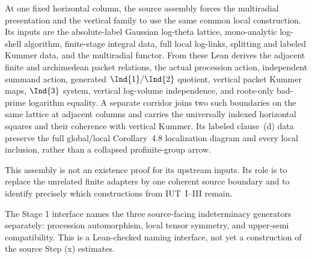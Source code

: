 \begin{definition}
  \label{def:source-theorem-311-column-boundary}
  \leanok
  At one fixed horizontal column, the source assembly forces the
  multiradial presentation and the vertical family to use the same common
  local construction.  Its inputs are the absolute-label Gaussian
  log-theta lattice, mono-analytic log-shell algorithm, finite-stage integral
  data, full local log-links, splitting and labeled Kummer data, and the
  multiradial functor.  From these Lean derives
  the adjacent finite and archimedean packet relations,
  the actual procession action, independent summand action, generated
  \(\Ind{1}/\Ind{2}\) quotient, vertical packet Kummer maps, \(\Ind{3}\)
  system, vertical log-volume independence, and roots-only bad-prime logarithm
  equality.  A separate corridor joins two such boundaries on the same
  lattice at adjacent columns and carries the universally indexed horizontal
  squares and their coherence with vertical Kummer.  Its labeled clause~(d)
  data preserve the full global/local Corollary~4.8 localization diagram and
  every local inclusion, rather than a collapsed profinite-group arrow.

  This assembly is not an existence proof for its upstream inputs.  Its role
  is to replace the unrelated finite adapters by one coherent source boundary
  and to identify precisely which constructions from IUT~I--III remain.
\end{definition}

\begin{definition}
  \label{def:indeterminacy-generator-interface}
  \leanok
  The Stage 1 interface names the three source-facing indeterminacy
  generators separately: procession automorphism, local tensor symmetry, and
  upper-semi compatibility.  This is a Lean-checked naming interface, not yet
  a construction of the source Step (x) estimates.
\end{definition}

